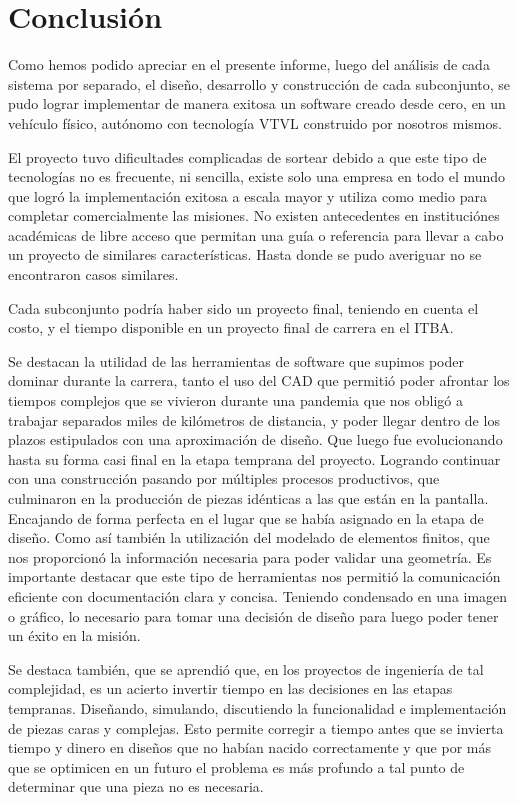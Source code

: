 \section{Conclusión}\label{sec:conclusion}

Como hemos podido apreciar en el presente informe, luego del análisis de cada sistema por separado, el diseño, desarrollo y construcción de cada subconjunto, se pudo lograr implementar de manera exitosa un software creado desde cero, en un vehículo físico, autónomo con tecnología VTVL construido por nosotros mismos.

\medskip

El proyecto tuvo dificultades complicadas de sortear debido a que este tipo de tecnologías no es frecuente, ni sencilla, existe solo una empresa en todo el mundo que logró la implementación exitosa a escala mayor y utiliza como medio para completar comercialmente las misiones. No existen antecedentes en instituciónes académicas de libre acceso que permitan una guía o referencia para llevar a cabo un proyecto de similares características. Hasta donde se pudo averiguar no se encontraron casos similares.

Cada subconjunto podría haber sido un proyecto final, teniendo en cuenta el costo, y el tiempo disponible en un proyecto final de carrera en el ITBA.

Se destacan la utilidad de las herramientas de software que supimos poder dominar durante la carrera, tanto el uso del CAD que permitió poder afrontar los tiempos complejos que se vivieron durante una pandemia que nos obligó a trabajar separados miles de kilómetros de distancia, y poder llegar dentro de los plazos estipulados con una aproximación de diseño. Que luego fue evolucionando hasta su forma casi final en la etapa temprana del proyecto. Logrando continuar con una construcción pasando por múltiples procesos productivos, que culminaron en la producción de piezas idénticas a las que están en la pantalla. Encajando de forma perfecta en el lugar que se había asignado en la etapa de diseño. Como así también la utilización del modelado de elementos finitos, que nos proporcionó la información necesaria para poder validar una geometría. Es importante destacar que este tipo de herramientas nos permitió la comunicación eficiente con documentación clara y concisa. Teniendo condensado en una imagen o gráfico, lo necesario para tomar una decisión de diseño para luego poder tener un éxito en la misión.

\medskip

Se destaca también, que se aprendió que, en los proyectos de ingeniería de tal complejidad, es un acierto invertir tiempo en las decisiones en las etapas tempranas. Diseñando, simulando, discutiendo la funcionalidad e implementación de piezas caras y complejas. Esto permite corregir a tiempo antes que se invierta tiempo y dinero en diseños que no habían nacido correctamente y que por más que se optimicen en un futuro el problema es más profundo a tal punto de determinar que una pieza no es necesaria.


